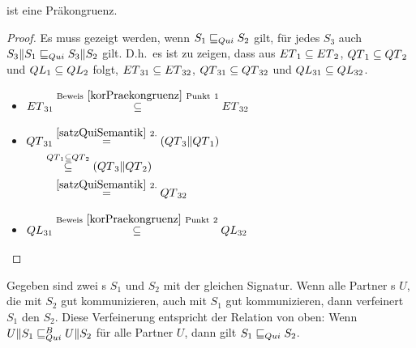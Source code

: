 \begin{prop}[Präkongruenz]
  \QRel{} ist eine Präkongruenz.
\end{prop}

\begin{proof}
  Es muss gezeigt werden, wenn $S_1\sqsubseteq _{Qui} S_2$ gilt,  für   jedes $
  S_3$ auch $S_3\|S_1\sqsubseteq _{Qui} S_3\|S_2$ gilt. D.h.\ es ist zu zeigen,
  dass aus $ET{}_1\subseteq ET{}_2$, $QT{}_1\subseteq QT{}_2$ und $QL{}_1\subseteq QL{}_2$
  folgt, $ET{}_{31}\subseteq ET{}_{32}$, $QT{}_{31}\subseteq QT{}_{32}$ und
  $QL{}_{31}\subseteq QL{}_{32}$.
  \begin{itemize}
    \item $\begin{aligned}[t]
        ET{}_{31} \overset{\mathrm{Beweis}~\ref{korPraekongruenz}
        ~\mathrm{Punkt}~1}{\subseteq} ET{}_{32}
    \end{aligned}$
    \item $\begin{aligned}[t]
        \QT{}_{31} &\overset{\ref{satzQuiSemantik}~2.}{=} (\QT{}_3\|\QT{}_1)\\
                &\hspace{-0.3cm}\overset{\QT{}_1\subseteq \QT{}_2}{\subseteq} (\QT{}_3\|\QT{}_2)\\
                &\overset{\ref{satzQuiSemantik}~2.}{=} \QT{}_{32}
    \end{aligned}$
    \item $\begin{aligned}[t]
        QL{}_{31} \overset{\mathrm{Beweis}~\ref{korPraekongruenz}
        ~\mathrm{Punkt}~2}{\subseteq} QL{}_{32}
    \end{aligned}$
  \end{itemize}
\end{proof}

\begin{lem}
  Gegeben sind zwei \EIO{}s $S_1$ und $S_2$ mit der gleichen Signatur. Wenn
  alle Partner \EIO{}s $U$, die mit $S_2$  gut kommunizieren, auch mit $S_1$
  gut kommunizieren, dann verfeinert $S_1$ den \EIO{} $S_2$. Diese Verfeinerung
  entspricht der Relation \QRel{} von oben: Wenn $U\|S_1\sqsubseteq _{Qui}^B U\|S_2$ für alle
  Partner $U$, dann gilt $S_1\sqsubseteq _{Qui} S_2$.
\end{lem}

